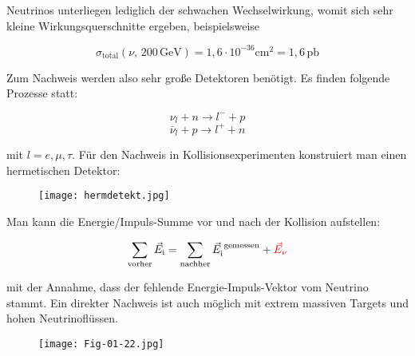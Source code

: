Neutrinos unterliegen lediglich der schwachen Wechselwirkung, womit sich sehr kleine
Wirkungsquerschnitte ergeben, beispielsweise

\[\sigma_\text{total}(\nu,\,200\,\text{GeV}) = 1{,}6\cdot10^{-36}\text{cm}^2 = 1{,}6\,\text{pb} \]

Zum Nachweis werden also sehr große Detektoren benötigt. Es finden folgende Prozesse statt:

\[ \nu_l + n \longrightarrow l^- + p \]
\[ \bar{\nu}_l + p \longrightarrow l^+ + n \]

mit $l=e,\mu,\tau$. Für den Nachweis in Kollisionsexperimenten konstruiert man einen hermetischen
Detektor: 

\begin{figure}[H]
	\centering
	\texttt{[image: hermdetekt.jpg]}
\end{figure}

Man kann die Energie/Impuls-Summe vor und nach der Kollision aufstellen:

\[\sum_\text{vorher} \vec{E}_\text{i} = \sum_\text{nachher} \vec{E}_\text{i}^\text{ gemessen}
+\textcolor{red}{\vec{E}_\nu}\]

mit der Annahme, dass der fehlende Energie-Impuls-Vektor vom Neutrino stammt. Ein direkter Nachweis
ist auch möglich mit extrem massiven Targets und hohen Neutrinoflüssen.

\begin{figure}[H]
	\centering
	\texttt{[image: Fig-01-22.jpg]}
\end{figure}